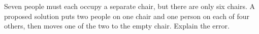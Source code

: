 Seven people must each occupy a separate chair, but there are only six chairs. A proposed solution puts two people on one chair and one person on each of four others, then moves one of the two to the empty chair. Explain the error.
